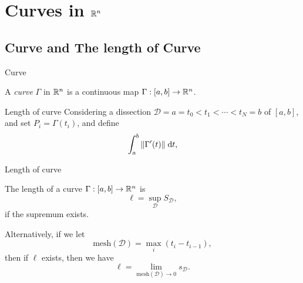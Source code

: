 \section{Curves in $\mathbb{R}^n$}


\subsection{Curve and The length of Curve}
\begin{frame}{Curve}
    \begin{defi}[Curve]
      A \emph{curve} $\Gamma$ in $\mathbb{R}^n$ is a continuous map $\Gamma: [a, b] \to \mathbb{R}^n$.
    \end{defi}
\end{frame}

\begin{frame}{Length of curve}
    Considering a dissection $\mathcal{D} = a = t_0 < t_1 < \cdots < t_N = b$ of $[a, b]$, and set $P_i = \Gamma(t_i)$, and define
    \[
      \int_a^b \|\Gamma'(t)\|\;\mathrm{d} t,
    \]
    \begin{center}
    \end{center}
\end{frame}

\begin{frame}{Length of curve}
    \begin{defi}
      The length of a curve $\Gamma: [a, b] \to \mathbb{R}^n$ is
      \[
        \ell = \sup_{\mathcal{D}} S_{\mathcal{D}},
      \]
      if the supremum exists.
    \end{defi}
    Alternatively, if we let
    \[
      \mathrm{mesh}(\mathcal{D})= \max_i (t_i - t_{i - 1}),
    \]
    then if $\ell$ exists, then we have
    \[
      \ell = \lim_{\mathrm{mesh}(\mathcal{D}) \to 0} s_{\mathcal{D}}.
    \]
\end{frame}

